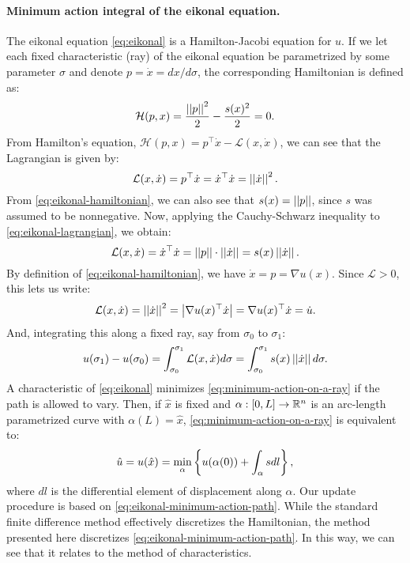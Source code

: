 \documentclass[eikonal.tex]{subfiles}
\begin{document}
\paragraph{Minimum action integral of the eikonal equation.} The
eikonal equation \cref{eq:eikonal} is a Hamilton-Jacobi equation for
$u$. If we let each fixed characteristic (ray) of the eikonal equation
be parametrized by some parameter $\sigma$ and denote
$p = \dot{x} = dx/d\sigma$, the corresponding Hamiltonian is defined
as:
\begin{equation}
  \label{eq:eikonal-hamiltonian}
  \mathcal{H}{(p, x)} = \frac{\norm{p}^2}{2} - \frac{s(x)^2}{2} = 0.
\end{equation}
From Hamilton's equation,
$\mathcal{H}(p, x) = p^\top \dot{x} - \mathcal{L}(x, \dot{x})$, we can
see that the Lagrangian is given by:
\begin{equation}
  \label{eq:eikonal-lagrangian}
  \mathcal{L}(x, \dot{x}) = p^\top \dot{x} = \dot{x}^\top \dot{x} = \norm{\dot{x}}^2.
\end{equation}
From \cref{eq:eikonal-hamiltonian}, we can also see that
$s(x) = \left|\left|p\right|\right|$, since $s$ was assumed to be nonnegative. Now,
applying the Cauchy-Schwarz inequality to
\cref{eq:eikonal-lagrangian}, we obtain:
\begin{equation}
  \label{eq:eikonal-lagrangian-2}
  \mathcal{L}(x, \dot{x}) = \dot{x}^\top \dot{x} = \norm{p} \cdot \norm{\dot{x}} = s(x) \norm{\dot{x}}.
\end{equation}
By definition of \cref{eq:eikonal-hamiltonian}, we have
$\dot{x} = p = \nabla u(x)$. Since $\mathcal{L} > 0$, this lets us
write:
\begin{equation}
  \mathcal{L}(x, \dot{x}) = \left|\left|\dot{x}\right|\right|^2 = \left|\nabla u(x)^\top \dot{x}\right| = \nabla u(x)^\top \dot{x} = \dot{u}.
\end{equation}
And, integrating this along a fixed ray, say from $\sigma_0$ to
$\sigma_1$:
\begin{equation}
  \label{eq:minimum-action-on-a-ray}
  u(\sigma_1) - u(\sigma_0) = \int_{\sigma_0}^{\sigma_1} \mathcal{L}(x, \dot{x}) d\sigma = \int_{\sigma_0}^{\sigma_1} s(x) \norm{\dot{x}} d\sigma.
\end{equation}
A characteristic of \cref{eq:eikonal} minimizes
\cref{eq:minimum-action-on-a-ray} if the path is allowed to
vary. Then, if $\hat{x}$ is fixed and $\alpha : [0, L] \to \mathbb{R}^n$ is an
arc-length parametrized curve with $\alpha(L) = \hat{x}$,
\cref{eq:minimum-action-on-a-ray} is equivalent to:
\begin{equation}\label{eq:eikonal-minimum-action-path}
  \hat{u} = u(\hat{x}) = \min_\alpha \curlyb{u(\alpha(0)) + \int_\alpha s dl},
\end{equation}
where $dl$ is the differential element of displacement along
$\alpha$. Our update procedure is based on
\cref{eq:eikonal-minimum-action-path}. While the standard finite
difference method effectively discretizes the Hamiltonian, the method
presented here discretizes \cref{eq:eikonal-minimum-action-path}. In
this way, we can see that it relates to the method of characteristics.
\end{document}
